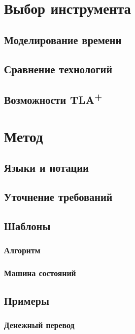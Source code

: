 \documentclass[14pt, openany]{book}
\newcommand{\tla}{TLA\textsuperscript{+}}
\begin{document}
\chapter{Выбор инструмента}

\section{Моделирование времени}

\section{Сравнение технологий}

\section{Возможности \tla}

\chapter{Метод}

\section{Языки и нотации}

\section{Уточнение требований}

\section{Шаблоны}

\subsection{Алгоритм}

\subsection{Машина состояний}

\section{Примеры}

\subsection{Денежный перевод}
\end{document}
